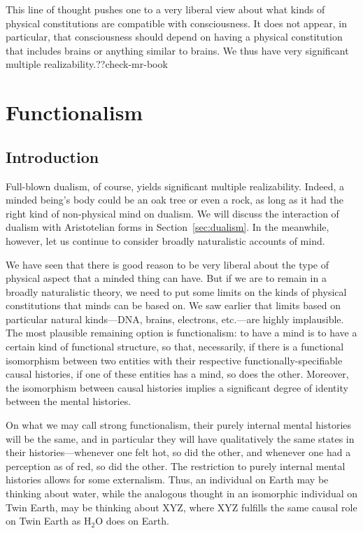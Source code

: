 This line of thought pushes one to a very liberal view about what kinds of physical constitutions are compatible with consciousness.
It does not appear, in particular, that consciousness should depend on having a physical constitution that includes brains or anything
similar to brains. We thus have very significant multiple realizability.??check-mr-book

\section{Functionalism}
\subsection{Introduction}
Full-blown dualism, of course, yields significant multiple realizability. Indeed, a minded being's body could be an oak tree or even a 
rock, as long as it had the right kind of non-physical mind on dualism. We will discuss the interaction of dualism with Aristotelian
forms in Section~\ref{sec:dualism}. In the meanwhile, however, let us continue to consider broadly naturalistic accounts of mind.

We have seen that there is good reason to be very liberal about the type of physical aspect that a minded thing can have.  But 
if we are to remain in a broadly naturalistic theory, we need to put some limits on the kinds of physical constitutions that
minds can be based on. We saw earlier that limits based on particular natural kinds---DNA, brains, electrons, etc.---are highly
implausible. The most plausible remaining option is functionalism: to have a mind is to have a certain kind of functional structure,
so that, necessarily, if there is a functional isomorphism between two entities with their respective functionally-specifiable 
causal histories, if one of these entities has a mind, so does the other. Moreover, the isomorphism between causal histories implies
a significant degree of identity between the mental histories. 

On what we may call strong functionalism, their purely internal mental histories
will be the same, and in particular they will have qualitatively the same states in their histories---whenever one felt hot, so did
the other, and whenever one had a perception as of red, so did the other. The restriction to purely internal mental histories allows
for some externalism. Thus, an individual on Earth may be thinking about water, while the analogous thought in an isomorphic individual
on Twin Earth, may be thinking about XYZ, where XYZ fulfills the same causal role on Twin Earth as H$_2$O does on Earth. 

